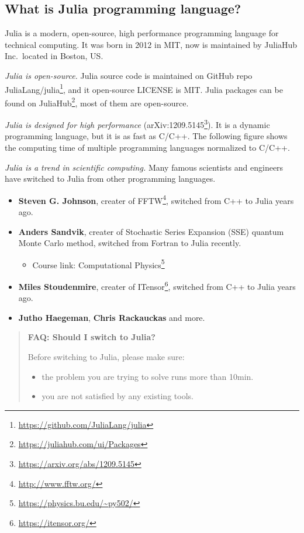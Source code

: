 \documentclass[
  notoc %
]{tufte-book}
\DeclareRobustCommand{\href}[2]{#2\footnote{\url{#1}}}
\providecommand{\tightlist}{%
  \setlength{\itemsep}{0pt}\setlength{\parskip}{0pt}
}
\begin{document}
\hypertarget{what-is-julia-programming-language}{%
\subsection{What is Julia programming
language?}\label{what-is-julia-programming-language}}

Julia is a modern, open-source, high performance programming language
for technical computing. It was born in 2012 in MIT, now is maintained
by JuliaHub Inc.~located in Boston, US.

\emph{Julia is open-source.} Julia source code is maintained on GitHub
repo \href{https://github.com/JuliaLang/julia}{JuliaLang/julia}, and it
open-source LICENSE is MIT. Julia packages can be found on
\href{https://juliahub.com/ui/Packages}{JuliaHub}, most of them are
open-source.

\emph{Julia is designed for high performance}
(\href{https://arxiv.org/abs/1209.5145}{arXiv:1209.5145}). It is a
dynamic programming language, but it is as fast as C/C++. The following
figure shows the computing time of multiple programming languages
normalized to C/C++.

\emph{Julia is a trend in scientific computing.} Many famous scientists
and engineers have switched to Julia from other programming languages.

\begin{itemize}
\tightlist
\item
  \textbf{Steven G. Johnson}, creater of
  \href{http://www.fftw.org/}{FFTW}, switched from C++ to Julia years
  ago.
\item
  \textbf{Anders Sandvik}, creater of Stochastic Series Expansion (SSE)
  quantum Monte Carlo method, switched from Fortran to Julia recently.

  \begin{itemize}
  \tightlist
  \item
    Course link: \href{https://physics.bu.edu/~py502/}{Computational
    Physics}
  \end{itemize}
\item
  \textbf{Miles Stoudenmire}, creater of
  \href{https://itensor.org/}{ITensor}, switched from C++ to Julia years
  ago.
\item
  \textbf{Jutho Haegeman}, \textbf{Chris Rackauckas} and more.
\end{itemize}

\begin{quote}
\textbf{FAQ: Should I switch to Julia?}

Before switching to Julia, please make sure:

\begin{itemize}
\tightlist
\item
  the problem you are trying to solve runs more than 10min.
\item
  you are not satisfied by any existing tools.
\end{itemize}
\end{quote}
\end{document}
